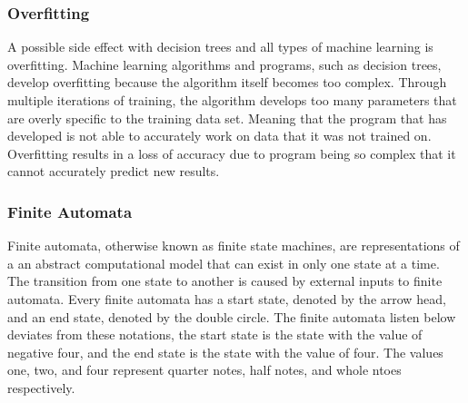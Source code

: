 \documentclass{sig-alternate}
\begin{document}

\subsubsection{Overfitting}
\label{sec:overfitting}
	A possible side effect with decision trees and all types of machine learning is overfitting. Machine learning algorithms and programs, such as decision trees, develop overfitting because the algorithm itself becomes too complex. Through multiple iterations of training, the algorithm develops too many parameters that are overly specific to the training data set. Meaning that the program that has developed is not able to accurately work on data that it was not trained on.  Overfitting results in a loss of accuracy due to program being so complex that it cannot accurately predict new results. 




\subsubsection{Finite Automata}
\label{sec:finiteautomata}
	Finite automata, otherwise known as finite state machines, are representations of a an abstract computational model that can exist in only one state at a time. The transition from one state to another is caused by external inputs to finite automata. Every finite automata has a start state, denoted by the arrow head, and an end state, denoted by the double circle. The finite automata listen below deviates from these notations, the start state is the state with the value of negative four, and the end state is the state with the value of four. The values one, two, and four represent quarter notes, half notes, and whole ntoes respectively.
\end{document}
